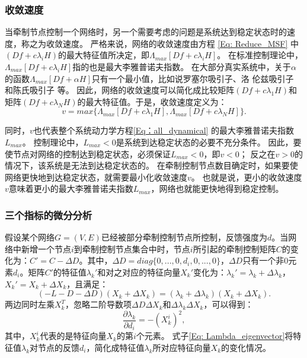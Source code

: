 \subsubsection{收敛速度}
当牵制节点控制一个网络时，另一个需要考虑的问题是系统达到稳定状态时的速度，称之为收敛速度。
严格来说，网络的收敛速度由方程 \ref{Eq: Reduce_MSF} 中$( Df+c{\lambda}_iH) $的最大特征值所决定，即$ \Lambda_{max}[Df + c{\lambda}_i H] $。
在标准控制理论中，$ \Lambda_{max}[Df + c{\lambda}_i H] $指的也是最大李雅普诺夫指数。
在大部分真实系统中，关于$ \alpha $的函数$ \Lambda_{max}[Df + \alpha H] $只有一个最小值，比如说罗塞尔吸引子、洛
伦兹吸引子 \cite{Stewart2000} 和陈氏吸引子 \cite{L2002} 等。
因此，网络的收敛速度可以简化成比较矩阵$ (Df+c\lambda_1H) $和矩阵$ (Df+c\lambda_NH) $的最大特征值。于是，收敛速度定义为：
\begin{equation}
v = max\{\Lambda_{max}[Df+c\lambda_1H],\Lambda_{max}[Df+c\lambda_NH]\}.
\end{equation}

同时，$ v $也代表整个系统动力学方程\ref{Eq：all_dynamical} 的最大李雅普诺夫指数$ L_{max} $。
控制理论中，$ L_{max}<0 $是系统到达稳定状态的必要不充分条件。
因此，要使节点对网络的控制达到稳定状态，必须保证$ L_{max}<0 $，即$ v<0 $；
反之在$ v>0 $的情况下，该系统是无法到达稳定状态的。
在牵制控制节点数目确定时，如果要使网络更快地到达稳定状态，就需要最小化收敛速度$ v $。
也就是说，更小的收敛速度$ v $意味着更小的最大李雅普诺夫指数$ L_{max} $，网络也就能更快地得到稳定控制。

\subsubsection{三个指标的微分分析}
假设某个网络$ G = (V, E) $已经被部分牵制控制节点所控制，反馈强度为$ d $。当网络中新增一个节点$ i $到牵制控制节点集合中时，节点$ i $所引起的牵制控制矩阵$ C $的变化为：$C'=C-\Delta D$。其中，$\Delta D=diag\{0,...,0,d_i,0,...,0\}$，$ \Delta D $只有一个非$ 0 $元素$ d_i $。矩阵$ C' $的特征值$ \lambda_k' $和对之对应的特征向量$ X_k' $变化为：$\lambda_k'=\lambda_k+\Delta{\lambda_k}$，$X_k'=X_k+\Delta{X_k}$，且满足：
\begin{equation}
(-L-D-\Delta{D})(X_k+\Delta{X_k}) = (\lambda_k+\Delta{\lambda_k})(X_k+\Delta{X_k}).
\label{Eq: single_driver}
\end{equation}
两边同时左乘$ X_k^T $，忽略二阶导数项$ \Delta{D}\Delta{X_k} $和$ \Delta{\lambda_k}\Delta{X_k} $，可以得到：
\begin{equation}
\frac{\partial\lambda_k}{\partial{d_i}} = -(X_k^i)^2,
\label{Eq: Lambda_eigenvector}
\end{equation}
其中，$ X_k^i $代表的是特征向量$ X_k $的第$ i $个元素。
式子\ref{Eq: Lambda_eigenvector}将特征值$ \lambda_k $对节点的反馈$ d_i $，简化成特征值$ \lambda_k $所对应特征向量$ X_k $的变化情况。

